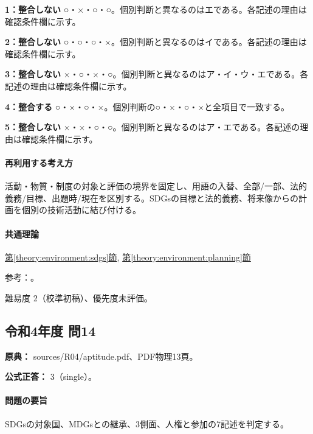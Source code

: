 \noindent\textbf{1：整合しない} ○・×・○・○。個別判断と異なるのはエである。各記述の理由は確認条件欄に示す。\par

\noindent\textbf{2：整合しない} ○・○・○・×。個別判断と異なるのはイである。各記述の理由は確認条件欄に示す。\par

\noindent\textbf{3：整合しない} ×・○・×・○。個別判断と異なるのはア・イ・ウ・エである。各記述の理由は確認条件欄に示す。\par

\noindent\textbf{4：整合する} ○・×・○・×。個別判断の○・×・○・×と全項目で一致する。\par

\noindent\textbf{5：整合しない} ×・×・○・○。個別判断と異なるのはア・エである。各記述の理由は確認条件欄に示す。\par

\paragraph{再利用する考え方} 活動・物質・制度の対象と評価の境界を固定し、用語の入替、全部/一部、法的義務/目標、出題時/現在を区別する。SDGsの目標と法的義務、将来像からの計画を個別の技術活動に結び付ける。

\paragraph{共通理論} \hyperref[theory:environment:sdgs]{第\ref*{theory:environment:sdgs}節}, \hyperref[theory:environment:planning]{第\ref*{theory:environment:planning}節}

\par 参考：\cite{env_sdgs_agenda,env_sdgs_binding,env_sdgs2016}。

\par 難易度 2（校準初稿）、優先度未評価。

\subsection{令和4年度 問14}
\label{q:r04-reg-apt-14}

\noindent\textbf{原典：} sources/R04/aptitude.pdf、PDF物理13頁。

\textbf{公式正答：} 3（single）。

\paragraph{問題の要旨} SDGsの対象国、MDGsとの継承、3側面、人権と参加の7記述を判定する。

